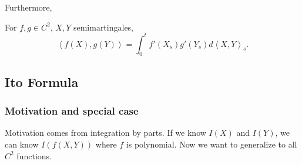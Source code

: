 Furthermore,
\begin{lemma}
	For $f, g \in C^2$, $X, Y$ semimartingales,
	\[
		\left\langle f(X), g(Y) \right\rangle 
		= \int _0^t f'(X_s) g'(Y_s) d \left\langle X, Y \right\rangle _s
	.\]
\end{lemma}

\subsection{Ito Formula}

\subsubsection{Motivation and special case}

Motivation comes from integration by parts. If we know $I(X)$ and $I(Y)$, we can know $I(f(X,Y))$ where $f$ is polynomial. Now we want to generalize to all $C^2$ functions.
